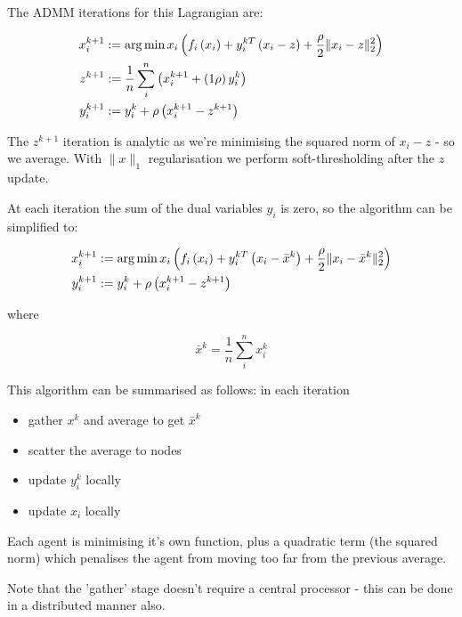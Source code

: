 \begin{example}[Consensus]
The ADMM iterations for this Lagrangian are:

\begin{align}
x_i^{k+1} &:= \operatorname*{arg\,min}{x_i} \left(f_i\left( x_i \right) + y_i^{kT}\left(x_i-z\right) + \frac{\rho}{2}\|x_i-z\|_2^2\right)\\
z^{k+1} &:= \frac{1}{n}\sum_i^n \left(x_i^{k+1} + \left(1\rho\right)y_i^k\right)\\
y_i^{k+1} &:= y_i^{k} + \rho \left(x_i^{k+1} - z^{k+1} \right)
\label{consensus_iterations}
\end{align}

The \(z^{k+1}\) iteration is analytic as we're minimising the squared norm of \(x_i - z\) - so we average. With \(\|x\|_1\) regularisation we perform soft-thresholding after the \(z\) update.

At each iteration the sum of the dual variables \(y_i\) is zero, so the algorithm can be simplified to:

\begin{align}
x_i^{k+1} &:= \operatorname*{arg\,min}{x_i} \left(f_i\left( x_i \right) + y_i^{kT}\left(x_i-\bar{x}^k\right) + \frac{\rho}{2}\|x_i-\bar{x}^k\|_2^2\right)\\
y_i^{k+1} &:= y_i^{k} + \rho \left(x_i^{k+1} - z^{k+1} \right)
\label{simple_consensus_iterations}
\end{align}
 
where

\begin{equation}
\bar{x}^k = \frac{1}{n} \sum_i^n x_i^k
\end{equation}

This algorithm can be summarised as follows: in each iteration

\begin{itemize}
\item gather \(x^k\) and average to get \(\bar{x}^k\)
\item scatter the average to nodes
\item update \(y_i^k\) locally
\item update \(x_i\) locally
\end{itemize}

Each agent is minimising it's own function, plus a quadratic term (the squared norm) which penalises the agent from moving too far from the previous average.

Note that the 'gather' stage doesn't require a central processor - this can be done in a distributed manner also.
\end{example}

